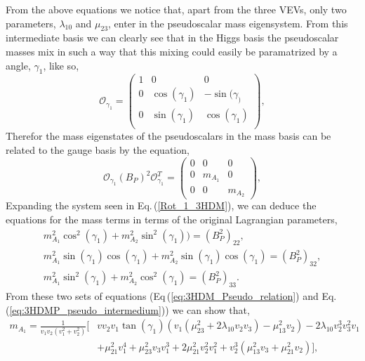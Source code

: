 %
From the above equations we notice that, apart from the three VEVs, only two parameters, $\lambda_{10}$ and $\mu_{23}$, enter in the pseudoscalar mass eigensystem. 
%
From this intermediate basis we can clearly see that in the Higgs basis the pseudoscalar masses mix in such a way that this mixing could easily be paramatrized by a angle, $\gamma_1$, like so,
%
%
\begin{equation}
\mathcal{O}_{\gamma_1} = \begin{pmatrix}
1 & 0 & 0 \\
0 & \cos(\gamma_1) & -\sin(\gamma_) \\ 
0 & \sin(\gamma_1) & \cos(\gamma_1) \\
\end{pmatrix} ,
\end{equation}
Therefor the mass eigenstates of the pseudoscalars in the mass basis can be related to the gauge basis by the equation,
\begin{equation}
\label{Rot_1_3HDM}
\mathcal{O}_{\gamma_1} \left( B_P \right)^2 \mathcal{O}_{\gamma_1}^T   = \begin{pmatrix}
0 & 0 & 0 \\ 
0 & m_{A_1} & 0 \\ 
0 & 0 & m_{A_2}
\end{pmatrix} ,
\end{equation}
Expanding the system seen in Eq.\,(\ref{Rot_1_3HDM}), we can deduce the equations for the mass terms in terms of the original Lagrangian parameters, 
\begin{equation}
\label{eq:3HDM_Pseudo_relation}
\begin{gathered}
m_{A_1}^2 \cos ^2\left(\gamma _1\right)+m_{A_2}^2 \sin ^2\left(\gamma _1\right)) = \left( B^2_P \right)_{22}, \\
m_{A_1}^2 \sin \left(\gamma _1\right) \cos \left(\gamma _1\right)+m_{A_2}^2 \sin \left(\gamma _1\right) \cos \left(\gamma _1\right) = \left( B^2_P \right)_{32}, \\ 
m_{A_1}^2 \sin ^2\left(\gamma _1\right)+m_{A_2}^2 \cos ^2\left(\gamma _1\right) = \left( B^2_P \right)_{33}. 
\end{gathered}
\end{equation}
From these two sets of equations (Eq\,(\ref{eq:3HDM_Pseudo_relation}) and Eq.\,(\ref{eq:3HDMP_pseudo_intermedium})) we can show that, %
\begin{equation}
\begin{split}
m_{A_1} = \frac{1}{v_1 v_2 \left(v_1^2+v_2^2\right)} \Bigg[ & v v_2 v_1 \tan \left(\gamma _1\right) \left(v_1 \left(\mu _{23}^2+2 \lambda _{10} v_2 v_3\right)-\mu_{13}^2 v_2\right)-2 \lambda _{10} v_2^3 v_3^2 v_1 \\ &  + \mu _{21}^2 v_1^4+\mu _{23}^2 v_3 v_1^3+2 \mu_{21}^2 v_2^2 v_1^2+v_2^3 \left(\mu _{13}^2 v_3+\mu _{21}^2 v_2\right) \Bigg],  \\ 
\end{split}
\end{equation}
